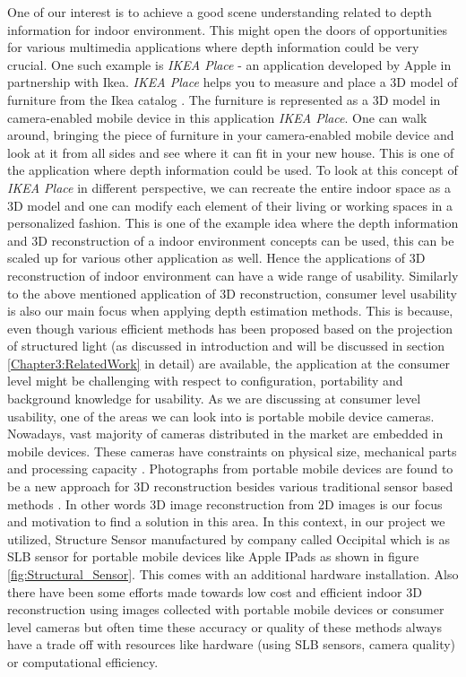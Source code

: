 One of our interest is to achieve a good scene understanding related to depth information for indoor environment. This might open the doors of opportunities for various multimedia applications where depth information could be very crucial. One such example is \textit{IKEA Place} - an application developed by Apple in partnership with Ikea. \textit{IKEA Place} helps you to measure and place a 3D model of furniture from the Ikea catalog \cite{lehnert2017neue}. The furniture is represented as a 3D model in camera-enabled mobile device in this application \textit{IKEA Place}. One can walk around, bringing the piece of furniture in your camera-enabled mobile device and look at it from all sides and see where it can fit in your new house. This is one of the application where depth information could be used. To look at this concept of \textit{IKEA Place} in different perspective, we can recreate the entire indoor space as a 3D model and one can modify each element of their living or working spaces in a personalized fashion. This is one of the example idea where the depth information and 3D reconstruction of a indoor environment concepts can be used, this can be scaled up for various other application as well. Hence the applications of 3D reconstruction of indoor environment can have a wide range of usability. Similarly to the above mentioned application of 3D reconstruction, consumer level usability is also our main focus when applying depth estimation methods.  This is because, even though various efficient methods has been proposed based on the projection of structured light (as discussed in introduction and will be discussed in section \ref{Chapter3:RelatedWork} in detail) are available, the application at the consumer level might be challenging with respect to configuration, portability and background knowledge for usability. As we are discussing at consumer level usability, one of the areas we can look into is portable mobile device cameras. Nowadays, vast majority of cameras distributed in the market are embedded in mobile devices. These cameras have constraints on physical size, mechanical parts and processing capacity \cite{lee2007constraints}. Photographs from portable mobile devices are found to be a new approach for 3D reconstruction besides various traditional sensor based methods \cite{micheletti2015investigating, adan20113d}. In other words 3D image reconstruction from 2D images is our focus and motivation to find a solution in this area. In this context, in our project we utilized,  Structure Sensor manufactured by company called Occipital which is as SLB sensor for portable mobile devices like Apple IPads as shown in figure \ref{fig:Structural_Sensor}. This comes with an additional hardware installation. Also there have been some efforts made towards low cost and efficient indoor 3D reconstruction using images collected with portable mobile devices or consumer level cameras \cite{ding2019low} but often time these accuracy or quality of these methods always have a trade off with resources like hardware (using SLB sensors, camera quality) or computational efficiency.

